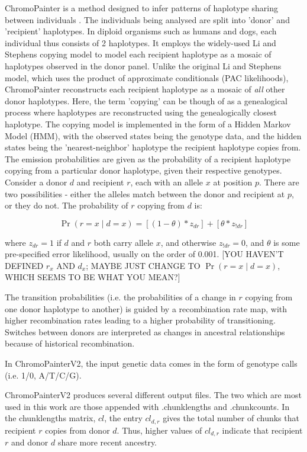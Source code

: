 ChromoPainter is a method designed to infer patterns of haplotype sharing between individuals \cite{Lawson2012}. The individuals being analysed are split into 'donor' and 'recipient' haplotypes. In diploid organisms such as humans and dogs, each individual thus consists of 2 haplotypes. It employs the widely-used Li and Stephens copying model \cite{Li2003} to model each recipient haplotype as a mosaic of haplotypes observed in the donor panel. Unlike the original Li and Stephens model, which uses the product of approximate conditionals (PAC likelihoods), ChromoPainter reconstructs each recipient haplotype as a mosaic of \textit{all} other donor haplotypes. Here, the term 'copying' can be though of as a genealogical process where haplotypes are reconstructed using the genealogically closest haplotype. The copying model is implemented in the form of a Hidden Markov Model (HMM), with the observed states being the genotype data, and the hidden states being the 'nearest-neighbor' haplotype the recipient haplotype copies from. The emission probabilities are given as the probability of a recipient haplotype copying from a particular donor haplotype, given their respective genotypes. Consider a donor $d$ and recipient $r$, each with an allele $x$ at position $p$. There are two possibilities - either the alleles match between the donor and recipient at $p$, or they do not. The probability of $r$ copying from $d$ is: 

\begin{equation}
\Pr(r = x \mid d = x) = [(1-\theta) * z_{dr}] + [\theta * z_{!dr}] 
\end{equation}

where $z_{dr} = 1$ if $d$ and $r$ both carry allele $x$, and otherwise $z_{!dr} = 0$, and $\theta$ is some pre-specified error likelihood, usually on the order of 0.001. {\color{red}[YOU HAVEN'T DEFINED $r_x$ AND $d_x$; MAYBE JUST CHANGE TO $\Pr(r = x \mid d = x)$, WHICH SEEMS TO BE WHAT YOU MEAN?]}

The transition probabilities (i.e. the probabilities of a change in $r$ copying from one donor haplotype to another) is guided by a recombination rate map, with higher recombination rates leading to a higher probability of transitioning. Switches between donors are interpreted as changes in ancestral relationships because of historical recombination.

In ChromoPainterV2, the input genetic data comes in the form of genotype calls (i.e. 1/0, A/T/C/G).

ChromoPainterV2 produces several different output files. The two which are most used in this work are those appended with .chunklengths and .chunkcounts. In the chunklengths matrix, $cl$, the entry $cl_{d,r}$ gives the total number of chunks that recipient $r$ copies from donor $d$. Thus, higher values of $cl_{d,r}$ indicate that recipient $r$ and donor $d$ share more recent ancestry. 

